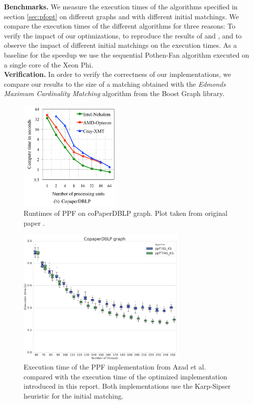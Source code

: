 \documentclass[letterpaper]{article}
\newcommand{\mypar}[1]{{\bf #1.}}
\begin{document}
\mypar{Benchmarks}
We measure the execution times of the algorithms specified in section \ref{sec:pfopt} on different graphs and with different initial matchings. We compare the execution times of the different algorithms for three reasons: To verify the impact of our optimizations, to reproduce the results of \cite{Azad:2012} and \cite{Azad:2015}, and to observe the impact of different initial matchings on the execution times. As a baseline for the speedup we use the sequential Pothen-Fan algorithm executed on a single core of the Xeon Phi.\\

\mypar{Verification}
In order to verify the correctness of our implementations, we compare our results to the size of a matching obtained with the \textit{Edmonds Maximum Cardinality Matching} algorithm \cite{BoostEdmonds} from the Boost Graph library.\\


\begin{figure}\centering
	\includegraphics[width=5cm]{../../plot/output/report/coPaperAzadPlot.png}
    \caption{Runtimes of PPF on coPaperDBLP graph. Plot taken from original paper \cite{Azad:2012}.}
	\label{fig:azadCopaper}
\end{figure}


\begin{figure}\centering
	\includegraphics[width=8.3cm]{../../plot/output/report/coPaperDBLP_PPFTASvsPPFTTAS.png}
	\caption{Execution time of the PPF implementation from Azad et al. compared with the execution time of the optimized implementation introduced in this report. Both implementations use the Karp-Sipser heuristic for the initial matching.}
	\label{fig:tasvsttas}
\end{figure}
\end{document}
